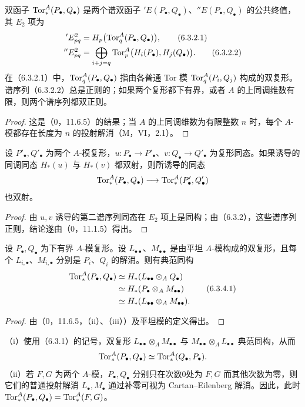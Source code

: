 双函子 $\operatorname{Tor}_*^A(P_\bullet,Q_\bullet)$ 是两个谱双函子 ${}'E(P_\bullet,Q_\bullet)$、${}''E(P_\bullet,Q_\bullet)$ 的公共终值，其 $E_2$ 项为
\begin{align}
 {}'E^2_{pq}&=H_p\bigl(\operatorname{Tor}_q^A(P_\bullet,Q_\bullet)\bigr),\tag{6.3.2.1}\\
 {}''E^2_{pq}&=\bigoplus_{i+j=q}\operatorname{Tor}_p^A\bigl(H_i(P_\bullet),H_j(Q_\bullet)\bigr).\tag{6.3.2.2}
\end{align}
在（6.3.2.1）中，$\operatorname{Tor}_q^A(P_\bullet,Q_\bullet)$ 指由各普通 Tor 模 $\operatorname{Tor}_q^A(P_i,Q_j)$ 构成的双复形。谱序列（6.3.2.2）总是正则的；如果两个复形都下有界，或者 $A$ 的上同调维数有限，则两个谱序列都双正则。
\begin{proof}
这是（0，11.6.5）的结果；当 $A$ 的上同调维数为有限整数 $n$ 时，每个 $A$-模都存在长度为 $n$ 的投射解消（M，VI，2.1）。
\end{proof}

设 $P'_\bullet,Q'_\bullet$ 为两个 $A$-模复形，$u:P_\bullet\to P'_\bullet$、$v:Q_\bullet\to Q'_\bullet$ 为复形同态。如果诱导的同调同态 $H_*(u)$ 与 $H_*(v)$ 都双射，则所诱导的同态
\[
 \operatorname{Tor}_*^A(P_\bullet,Q_\bullet)\longrightarrow
 \operatorname{Tor}_*^A(P'_\bullet,Q'_\bullet)
\]
也双射。
\begin{proof}
由 $u,v$ 诱导的第二谱序列同态在 $E_2$ 项上是同构；由（6.3.2），这些谱序列正则，结论遂由（0，11.1.5）得出。
\end{proof}

设 $P_\bullet,Q_\bullet$ 为下有界 $A$-模复形。设 $L_{\bullet\bullet}$、$M_{\bullet\bullet}$ 是由平坦 $A$-模构成的双复形，且每个 $L_{i,\bullet}$、$M_{i,\bullet}$ 分别是 $P_i$、$Q_i$ 的解消。则有典范同构
\begin{equation}
\begin{split}
 \operatorname{Tor}_*^A(P_\bullet,Q_\bullet)
 &\simeq H_*(L_{\bullet\bullet}\otimes_AQ_\bullet)\\
 &\simeq H_*(P_\bullet\otimes_AM_{\bullet\bullet})\\
 &\simeq H_*(L_{\bullet\bullet}\otimes_AM_{\bullet\bullet}).
\end{split}\tag{6.3.4.1}
\end{equation}
\begin{proof}
由（0，11.6.5，（ii）、（iii））及平坦模的定义得出。
\end{proof}

（i）使用（6.3.1）的记号，双复形 $L_{\bullet\bullet}\otimes_AM_{\bullet\bullet}$ 与 $M_{\bullet\bullet}\otimes_AL_{\bullet\bullet}$ 典范同构，从而
\[
 \operatorname{Tor}_*^A(P_\bullet,Q_\bullet)\simeq\operatorname{Tor}_*^A(Q_\bullet,P_\bullet).
\]
（ii）若 $F,G$ 为两个 $A$-模，$P_\bullet,Q_\bullet$ 分别只在次数0处为 $F,G$ 而其他次数为零，则它们的普通投射解消 $L_\bullet,M_\bullet$ 通过补零可视为 Cartan--Eilenberg 解消。因此，此时 $\operatorname{Tor}_*^A(P_\bullet,Q_\bullet)=\operatorname{Tor}_*^A(F,G)$。

